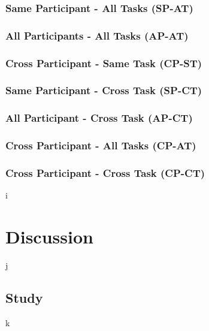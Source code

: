 \documentclass[11pt]{article}
\begin{document}
		\subsubsection{Same Participant - All Tasks (SP-AT)}
		
		\subsubsection{All Participants - All Tasks (AP-AT)}
		
		\subsubsection{Cross Participant - Same Task (CP-ST)}
		
		\subsubsection{Same Participant - Cross Task (SP-CT)}
		
		\subsubsection{All Participant - Cross Task (AP-CT)}
		
		\subsubsection{Cross Participant - All Tasks (CP-AT)}
		
		\subsubsection{Cross Participant - Cross Task (CP-CT)}
i
		
\section{Discussion}
j
	\subsection{Study}
k	
\end{document}
